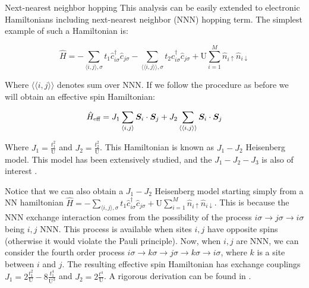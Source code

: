 \begin{subsection}{Next-nearest neighbor hopping}
This analysis can be easily extended to electronic Hamiltonians including next-nearest neighbor (NNN) hopping term. The simplest example of such a Hamiltonian is:

\begin{equation}
\hat{H} = -\sum_{\langle i,j \rangle, \sigma}t_{1}\hat{c}_{i \sigma}^\dagger \hat{c}_{j \sigma} -\sum_{\langle \langle i,j \rangle \rangle, \sigma} t_{2}\hat{c}_{i \sigma}^\dagger \hat{c}_{j \sigma} + \text{U} \sum_{i=1}^M \hat{n}_{i\uparrow}\hat{n}_{i\downarrow}
\end{equation}

Where $\langle \langle i,j \rangle \rangle$ denotes sum over NNN. If we follow the procedure as before we will obtain an effective spin Hamiltonian:

\begin{equation}
\hat{H}_{\text{eff}} = J_1\sum_{\langle i,j \rangle} \boldsymbol{S}_i\cdot\boldsymbol{S}_j + J_2\sum_{\langle \langle i,j \rangle \rangle}\boldsymbol{S}_i\cdot\boldsymbol{S}_j
\end{equation}

Where $J_1 = \frac{t_1^2}{\text{U}}$ and $J_2 = \frac{t_2^2}{\text{U}}$. This Hamiltonian is known as $J_1-J_2$ Heisenberg model. This model has been extensively studied, and the $J_1-J_2-J_3$ is also of interest \cite{Reuther2011}. 

Notice that we can also obtain a $J_1-J_2$ Heisenberg model starting simply from a NN hamiltonian $\hat{H} = -\sum_{\langle i,j \rangle, \sigma}t_{1}\hat{c}_{i \sigma}^\dagger \hat{c}_{j \sigma} + \text{U} \sum_{i=1}^M \hat{n}_{i\uparrow}\hat{n}_{i\downarrow}$. This is because the NNN exchange interaction comes from the possibility of the process $i\sigma \rightarrow j\sigma \rightarrow i\sigma$ being $i,j$ NNN. This process is available when sites $i, j$ have opposite spins (otherwise it would violate the Pauli principle). Now, when $i,j$ are NNN, we can consider the fourth order process $i\sigma \rightarrow k\sigma \rightarrow j\sigma \rightarrow k\sigma \rightarrow i\sigma$, where $k$ is a site between $i$ and $j$. The resulting effective spin Hamiltonian has exchange couplings $J_1 = 2\frac{t_1^2}{\text{U}} - 8 \frac{t_1^4}{\text{U}^3}$ and $J_2 = 2\frac{t^4}{\text{U}}$. A rigorous derivation can be found in \cite{MacDonald1988}. 

\end{subsection}

